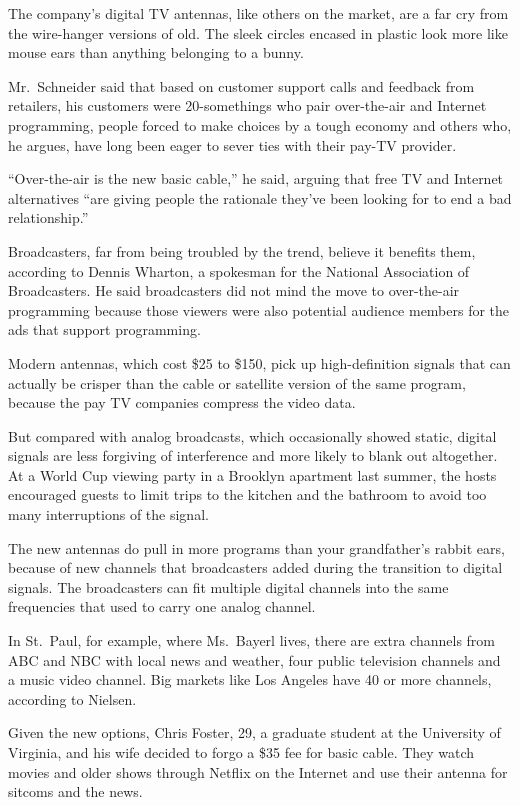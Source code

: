 ﻿\documentclass[12pt]{article}
\begin{document}
The company's digital TV antennas, like others on the market, are a far cry from the wire-hanger
versions of old. The sleek circles encased in plastic look more like mouse ears than anything
belonging to a bunny.

Mr.~Schneider said that based on customer support calls and feedback from retailers, his customers
were 20-somethings who pair over-the-air and Internet programming, people forced to make choices by
a tough economy and others who, he argues, have long been eager to sever ties with their pay-TV
provider.

``Over-the-air is the new basic cable,'' he said, arguing that free TV and Internet alternatives
``are giving people the rationale they've been looking for to end a bad relationship.''

Broadcasters, far from being troubled by the trend, believe it benefits them, according to Dennis
Wharton, a spokesman for the National Association of Broadcasters. He said broadcasters did not mind
the move to over-the-air programming because those viewers were also potential audience members for
the ads that support programming.

Modern antennas, which cost \$25 to \$150, pick up high-definition signals that can actually be
crisper than the cable or satellite version of the same program, because the pay TV companies
compress the video data.

But compared with analog broadcasts, which occasionally showed static, digital signals are less
forgiving of interference and more likely to blank out altogether. At a World Cup viewing party in a
Brooklyn apartment last summer, the hosts encouraged guests to limit trips to the kitchen and the
bathroom to avoid too many interruptions of the signal.

The new antennas do pull in more programs than your grandfather's rabbit ears, because of new
channels that broadcasters added during the transition to digital signals. The broadcasters can fit
multiple digital channels into the same frequencies that used to carry one analog channel.

In St.~Paul, for example, where Ms.~Bayerl lives, there are extra channels from ABC and NBC with
local news and weather, four public television channels and a music video channel. Big markets like
Los Angeles have 40 or more channels, according to Nielsen.

Given the new options, Chris Foster, 29, a graduate student at the University of Virginia, and his
wife decided to forgo a \$35 fee for basic cable. They watch movies and older shows through Netflix
on the Internet and use their antenna for sitcoms and the news.
\end{document}

